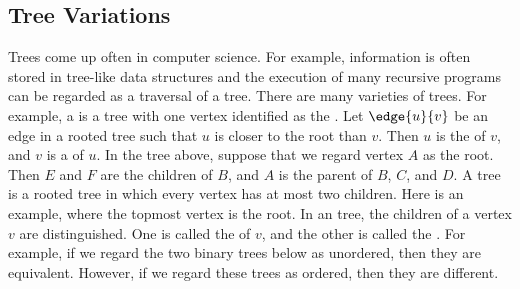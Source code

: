 \begin{staffnotes}

\subsection{Tree Variations}
Trees come up often in computer science.  For example, information is
often stored in tree-like data structures and the execution of many
recursive programs can be regarded as a traversal of a tree.
There are many varieties of trees.  For example, a 
is a tree with one vertex identified as the .  Let
$\edge{u}{v}$ be an edge in a rooted tree such that $u$ is closer to
the root than $v$.  Then $u$ is the  of $v$, and $v$ is
a  of $u$.
In the tree above, suppose that we regard vertex $A$ as the
root.  Then $E$ and $F$ are the children of $B$, and $A$ is the parent
of $B$, $C$, and $D$.
A  tree is a rooted tree in which every vertex has at most
two children.  Here is an example, where the topmost vertex is the
root.
In an  tree, the children of a vertex $v$ are
distinguished.  One is called the  of $v$, and the
other is called the .  For example, if we regard the
two binary trees below as unordered, then they are equivalent.
However, if we regard these trees as ordered, then they are different.

\end{staffnotes}

